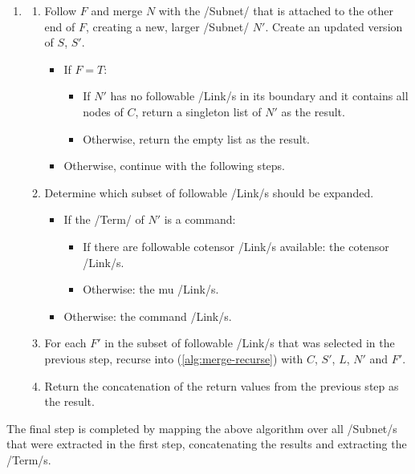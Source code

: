 \documentclass[12pt,a4paper]{article}
\begin{document}
\begin{enumerate}
    \item\label{alg:merge-recurse} \hfill \begin{enumerate}
        \item Follow $F$ and merge $N$ with the \hs/Subnet/ that is attached to the other end of $F$, creating a new, larger \hs/Subnet/ $N'$. Create an updated version of $S$, $S'$.\begin{itemize}
            \item If $F = T$:\begin{itemize}
                \item If $N'$ has no followable \hs/Link/s in its boundary and it contains all nodes of $C$, return a singleton list of $N'$ as the result.
                \item Otherwise, return the empty list as the result.
            \end{itemize}
            \item Otherwise, continue with the following steps.
        \end{itemize}
        \item\label{alg:expand-list} Determine which subset of followable \hs/Link/s should be expanded.\begin{itemize}
            \item If the \hs/Term/ of $N'$ is a command:\begin{itemize}
                \item If there are followable cotensor \hs/Link/s available: the cotensor \hs/Link/s.
                \item Otherwise: the mu \hs/Link/s.
            \end{itemize}
            \item Otherwise: the command \hs/Link/s.
        \end{itemize}
        \item For each $F'$ in the subset of followable \hs/Link/s that was selected in the previous step, recurse into (\ref{alg:merge-recurse}) with $C$, $S'$, $L$, $N'$ and $F'$.
        \item Return the concatenation of the return values from the previous step as the result.
    \end{enumerate}
\end{enumerate}
The final step is completed by mapping the above algorithm over all \hs/Subnet/s that were extracted in the first step, concatenating the results and extracting the \hs/Term/s.
\end{document}

